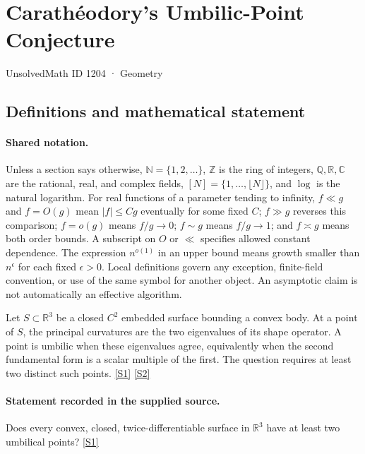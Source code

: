 \documentclass[11pt,a4paper]{article}
\newcommand{\N}{\mathbb{N}}
\newcommand{\Z}{\mathbb{Z}}
\newcommand{\Q}{\mathbb{Q}}
\newcommand{\R}{\mathbb{R}}
\newcommand{\C}{\mathbb{C}}
\newcommand{\sref}[2]{\hyperlink{source:#1:#2}{[S#2]}}
\begin{document}

\setcounter{section}{1203}

\section{Carathéodory's Umbilic-Point Conjecture}\label{1204}

{\small\sffamily UnsolvedMath ID 1204 · Geometry}

\subsection{Definitions and mathematical statement}

\paragraph{Shared notation.}Unless a section says otherwise, $\N=\{1,2,\ldots\}$,
$\Z$ is the ring of integers, $\Q,\R,\C$ are the rational, real, and complex
fields, $[N]=\{1,\ldots,\lfloor N\rfloor\}$, and $\log$ is the natural
logarithm. For real functions of a parameter tending to infinity,
$f\ll g$ and $f=O(g)$ mean $|f|\leq Cg$ eventually for some fixed $C$;
$f\gg g$ reverses this comparison; $f=o(g)$ means $f/g\to0$;
$f\sim g$ means $f/g\to1$; and $f\asymp g$ means both order bounds.
A subscript on $O$ or $\ll$ specifies allowed constant dependence.
The expression $n^{o(1)}$ in an upper bound means growth smaller than
$n^\epsilon$ for each fixed $\epsilon>0$. Local definitions govern any
exception, finite-field convention, or use of the same symbol for another
object. An asymptotic claim is not automatically an effective algorithm.



Let $S\subset\R^3$ be a closed $C^2$ embedded surface bounding a convex body. At a point of $S$, the principal curvatures are the two eigenvalues of its shape operator. A point is umbilic when these eigenvalues agree, equivalently when the second fundamental form is a scalar multiple of the first. The question requires at least two distinct such points. \sref{1204}{1} \sref{1204}{2}

\paragraph{Statement recorded in the supplied source.}
Does every convex, closed, twice-differentiable surface in $\mathbb{R}^3$ have at least two umbilical points? \sref{1204}{1}
\end{document}
